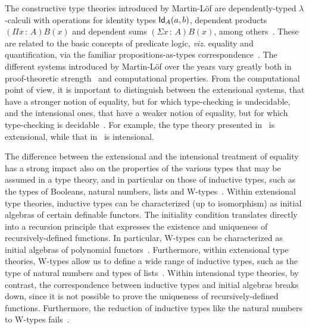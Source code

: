 The constructive type theories introduced by Martin-L\"of are dependently-typed
$\lambda$-calculi with operations for identity types $\mathsf{Id}_{A}(a,b)$, dependent products 
$(\Pi x {\, : \,}  A)B(x)$ and dependent sums $(\Sigma x {\, : \,} A)B(x)$,  among others~\cite{MartinLofP:intttp,MartinLofP:conmcp,MartinLofP:inttt,NordstromB:promlt,NordstromB:marltt}.   
These are related to the basic concepts of predicate logic, \emph{viz.}
equality and quantification, via the familiar propositions-as-types correspondence~\cite{HowardWH:foratn}. The different systems introduced by Martin-L\"of over the years 
vary greatly both in proof-theoretic strength~\cite{GrifforE:strsml} and computational
properties. From the computational point of view, it is important to
distinguish between the extensional systems, that have a stronger
notion of equality, but for which type-checking is undecidable, and the intensional ones, that have a
weaker notion of equality, but for which type-checking is decidable~\cite{HofmannM:extcit}. For example, the type theory presented in~\cite{MartinLofP:inttt} is extensional, while that in~\cite{NordstromB:marltt} is 
intensional.

The difference between the extensional and the intensional treatment of equality has a strong 
impact also on the properties of the various types that may be assumed in a type theory, and in particular
on those of inductive types, such as the types of Booleans, natural numbers, lists and W-types~\cite{MartinLofP:conmcp}.  Within extensional type theories, inductive types can be 
characterized (up to isomorphism) as initial algebras of certain definable functors. The initiality condition 
translates directly into a recursion principle that expresses the existence and uniqueness of 
recursively-defined functions. In particular, W-types can be characterized as initial algebras of polynomial functors~\cite{DybjerP:repids,MoerdijkI:weltc}. Furthermore, within extensional type theories, W-types allow us to define a wide range of inductive types, such as the type of natural numbers and types of lists~\cite{DybjerP:repids,GambinoN:weltdp,AbbottM:concsp}.
Within intensional type theories, by contrast, the correspondence between inductive types and initial algebras 
breaks down, since it is not possible to prove the uniqueness of recursively-defined functions. 
Furthermore, the reduction of inductive types like the natural numbers to W-types fails~\cite{DybjerP:repids,GoguenH:inddtw}.
 
